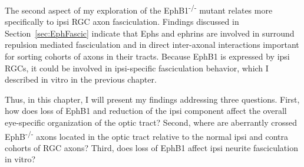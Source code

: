The second aspect of my exploration of the EphB1\textsuperscript{-/-} mutant relates more specifically to ipsi RGC axon fasciculation.
Findings discussed in Section~\ref{sec:EphFascic} indicate that Ephs and ephrins are involved in surround repulsion mediated fasciculation and in direct inter-axonal interactions important for sorting cohorts of axons in their tracts.
Because EphB1 is expressed by ipsi RGCs, it could be involved in ipsi-specific fasciculation behavior, which I described in vitro in the previous chapter.

Thus, in this chapter, I will present my findings addressing three questions.
First, how does loss of EphB1 and reduction of the ipsi component affect the overall eye-specific organization of the optic tract?
Second, where are aberrantly crossed EphB\textsuperscript{-/-} axons located in the optic tract relative to the normal ipsi and contra cohorts of RGC axons?
Third, does loss of EphB1 affect ipsi neurite fasciculation in vitro?